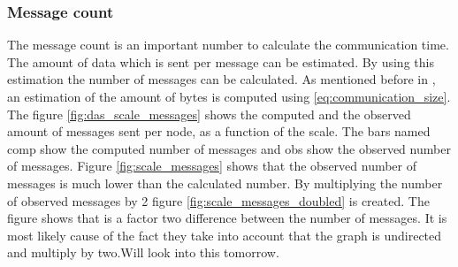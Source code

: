 \subsubsection{Message count}
The message count is an important number to calculate the communication time. The amount of data which is sent per message can be estimated. By using this estimation the number of messages can be calculated. As mentioned before in \cite{suzumura2011performance}, an estimation of the amount of bytes is computed using \ref{eq:communication_size}. The figure \ref{fig:das_scale_messages} shows the computed and the observed amount of messages sent per node, as a function of the scale. The bars named comp show the computed number of messages and obs show the observed number of messages. Figure \ref{fig:scale_messages} shows that the observed number of messages is much lower than the calculated number. By multiplying the number of observed messages by 2 figure \ref{fig:scale_messages_doubled} is created. The figure shows that is a factor two difference between the number of messages. It is most likely cause of the fact they take into account that the graph is undirected and multiply by two.Will look into this tomorrow. 
